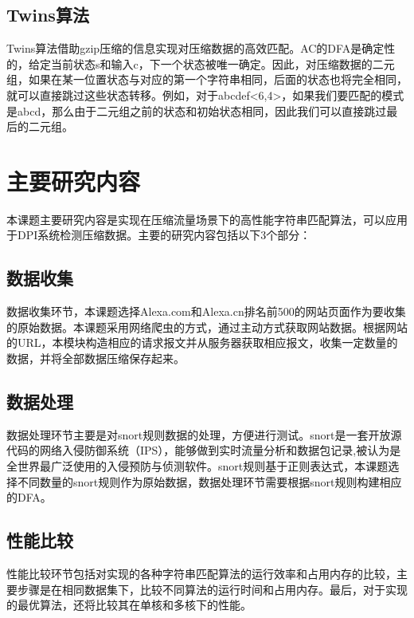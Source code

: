 \vspace{3mm}
\subsection{Twins算法}
Twins算法借助gzip压缩的信息实现对压缩数据的高效匹配。AC的DFA是确定性的，给定当前状态s和输入c，下一个状态被唯一确定。因此，对压缩数据的二元组，如果在某一位置状态与对应的第一个字符串相同，后面的状态也将完全相同，就可以直接跳过这些状态转移。例如，对于abcdef<6,4>，如果我们要匹配的模式是abcd，那么由于二元组之前的状态和初始状态相同，因此我们可以直接跳过最后的二元组。

\vspace{8mm}
\section{主要研究内容}

本课题主要研究内容是实现在压缩流量场景下的高性能字符串匹配算法，可以应用于DPI系统检测压缩数据。主要的研究内容包括以下3个部分：

\subsection{数据收集}
数据收集环节，本课题选择Alexa.com和Alexa.cn排名前500的网站页面作为要收集的原始数据。本课题采用网络爬虫的方式，通过主动方式获取网站数据。根据网站的URL，本模块构造相应的请求报文并从服务器获取相应报文，收集一定数量的数据，并将全部数据压缩保存起来。

\vspace{3mm}
\subsection{数据处理}
数据处理环节主要是对snort规则数据的处理，方便进行测试。snort\cite{roesch1999snort}是一套开放源代码的网络入侵防御系统（IPS），能够做到实时流量分析和数据包记录,被认为是全世界最广泛使用的入侵预防与侦测软件。snort规则基于正则表达式，本课题选择不同数量的snort规则作为原始数据，数据处理环节需要根据snort规则构建相应的DFA。

\vspace{3mm}
\subsection{性能比较}
性能比较环节包括对实现的各种字符串匹配算法的运行效率和占用内存的比较，主要步骤是在相同数据集下，比较不同算法的运行时间和占用内存。最后，对于实现的最优算法，还将比较其在单核和多核下的性能。

